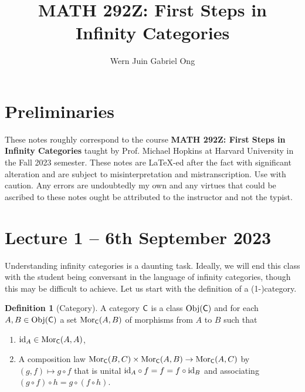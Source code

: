 \documentclass{amsart}
\theoremstyle{definition}
\newtheorem{definition}[theorem]{Definition}
\numberwithin{equation}{section}
\begin{document}
\large
\title[Infinity Categories]{MATH 292Z: First Steps in Infinity Categories}
\author{Wern Juin Gabriel Ong}
\address{Bowdoin College, Brunswick, Maine 04011}
\maketitle
\section*{Preliminaries}
These notes roughly correspond to the course \textbf{MATH 292Z: First Steps in Infinity Categories} taught by Prof. Michael Hopkins at Harvard University in the Fall 2023 semester. These notes are \LaTeX-ed after the fact with significant alteration and are subject to misinterpretation and mistranscription. Use with caution. Any errors are undoubtedly my own and any virtues that could be ascribed to these notes ought be attributed to the instructor and not the typist. 
\tableofcontents
\section{Lecture 1 -- 6th September 2023}
Understanding infinity categories is a daunting task. Ideally, we will end this class with the student being conversant in the language of infinity categories, though this may be difficult to achieve. Let us start with the definition of a (1-)category. 
\begin{definition}[Category]
    A category $\mathsf{C}$ is a class $\mathrm{Obj}(\mathsf{C})$ and for each $A,B\in\mathrm{Obj}(\mathsf{C})$ a set $\mathrm{Mor}_{\mathsf{C}}(A,B)$ of morphisms from $A$ to $B$ such that
    \begin{enumerate}[label=(\alph*)]
        \item $\mathrm{id}_{A}\in\mathrm{Mor}_{\mathsf{C}}(A,A)$,
        \item A composition law $\mathrm{Mor}_{\mathsf{C}}(B,C)\times\mathrm{Mor}_{\mathsf{C}}(A,B)\to\mathrm{Mor}_{\mathsf{C}}(A,C)$ by $(g,f)\mapsto g\circ f$ that is unital $\mathrm{id}_{A}\circ f=f=f\circ\mathrm{id}_{B}$ and associating $(g\circ f)\circ h=g\circ(f\circ h)$. 
    \end{enumerate}
\end{definition}
\end{document}
